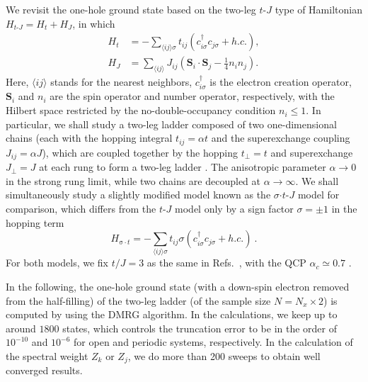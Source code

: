 \documentclass[aps,prb,twocolumn,notitlepage,superscriptaddress,showpacs]{revtex4-1}
\begin{document}
We revisit the one-hole ground state based on the two-leg $t$-$J$ type of Hamiltonian $H_{t\text{-}J} = H_t+H_J$, in which
\begin{equation}\label{t-J}
\begin{split}
H_t &= - \sum_{\langle {ij}\rangle \sigma } t_{ij}{({c_{i\sigma }^{\dag}c_{j\sigma }+h.c.})}, \\
H_J &= \sum_{\langle {ij}\rangle } J_{ij}{(\mathbf{S}_{i}\cdot \mathbf{S}_{j}-\frac{1}{4}n_{i}n_{j})}.
\end{split}
\end{equation}
Here, $\langle ij\rangle $ stands for the nearest neighbors, ${c_{i\sigma }^{\dagger }}$ is the electron creation operator, ${\mathbf{S}_{i}}$ and ${n_{i}}$ are the spin operator and number operator, respectively, with the Hilbert space restricted by the no-double-occupancy condition $n_{i}\leq 1$. In particular, we shall study a two-leg ladder composed of two one-dimensional chains  (each with the hopping integral $t_{ij}=\alpha t$ and the superexchange coupling $J_{ij}=\alpha J$), which are coupled together by the hopping $t_{\perp}=t$ and superexchange $J_{\perp}=J$ at each rung to form a two-leg ladder \cite{ZZ2013,ZZ2014qp}. The anisotropic parameter $\alpha\rightarrow 0$ in the strong rung limit, while two chains are decoupled at $\alpha \rightarrow \infty$. We shall simultaneously study a slightly modified model known as the $\sigma$$\cdot$$t$-$J$ model \cite{ZZ2013,ZZ2014qp} for comparison, which differs from the $t$-$J$ model only by a sign factor $\sigma=\pm 1$ in the hopping term
\begin{equation}\label{sigmat}
H_{\mathrm{\sigma} \cdot t}= - \sum_{\langle {ij}\rangle \sigma } t_{ij}\sigma{({c_{i\sigma }^{\dag}c_{j\sigma }+h.c.})}~.
\end{equation}
For both models, we fix $t/J=3$ as the same in Refs.~, with the QCP $\alpha_c\simeq 0.7$ \cite{ZZ2014qp,ZZ2014cm,WSK2015}.

In the following, the one-hole ground state (with a down-spin electron removed from the half-filling) of the two-leg ladder (of the sample size $N= N_x\times 2$) is computed by using the DMRG algorithm. In the calculations, we keep up to around $1800$ states, which controls the truncation error to be in the order of $10^{-10}$ and $10^{-6}$ for open and periodic systems, respectively.
In the calculation of the spectral weight $Z_k$ or $Z_j$, we do more than 200 sweeps to obtain well converged results.
\end{document}
